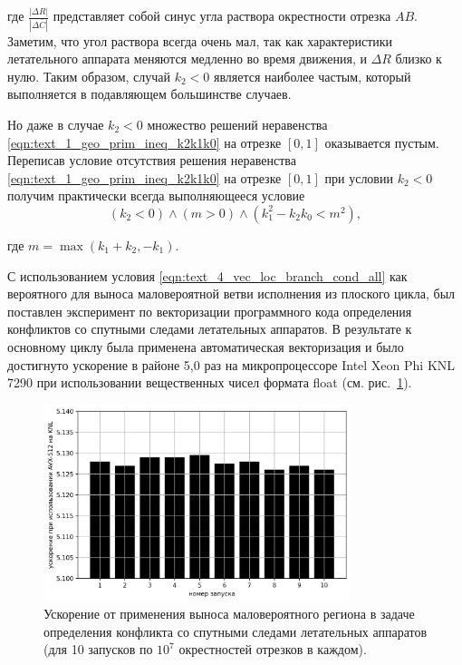 где $\frac{|\Delta R|}{|\Delta \overline{C}|}$ представляет собой синус угла раствора окрестности отрезка $AB$.
Заметим, что угол раствора всегда очень мал, так как характеристики летательного аппарата меняются медленно во время движения, и $\Delta R$ близко к нулю.
Таким образом, случай $k_2 < 0$ является наиболее частым, который выполняется в подавляющем большинстве случаев.

Но даже в случае $k_2 < 0$ множество решений неравенства \eqref{eqn:text_1_geo_prim_ineq_k2k1k0} на отрезке $[0, 1]$ оказывается пустым.
Переписав условие отсутствия решения неравенства \eqref{eqn:text_1_geo_prim_ineq_k2k1k0} на отрезке $[0, 1]$ при условии $k_2 < 0$ получим практически всегда выполняющееся условие
\begin{equation}\label{eqn:text_4_vec_loc_branch_cond_all}
	(k_2 < 0) \land (m > 0) \land (k_1^2 - k_2k_0 < m^2),
\end{equation}

где $m = \max(k_1 + k_2, -k_1)$.

С использованием условия \eqref{eqn:text_4_vec_loc_branch_cond_all} как вероятного для выноса маловероятной ветви исполнения из плоского цикла, был поставлен эксперимент по векторизации программного кода определения конфликтов со спутными следами летательных аппаратов.
В результате к основному циклу была применена автоматическая векторизация и было достигнуто ускорение в районе 5,0 раз на микропроцессоре Intel Xeon Phi KNL 7290 при использовании вещественных чисел формата float (см. рис.~\ref{fig:text_4_vec_loc_branch_res}).

\begin{figure}[ht]
\centering
\includegraphics[width=0.8\textwidth]{./pics/text_4_vec_loc_branch/res.png}
\caption{Ускорение от применения выноса маловероятного региона в задаче определения конфликта со спутными следами летательных аппаратов (для 10 запусков по $10^7$ окрестностей отрезков в каждом).}
\label{fig:text_4_vec_loc_branch_res}
\end{figure}

